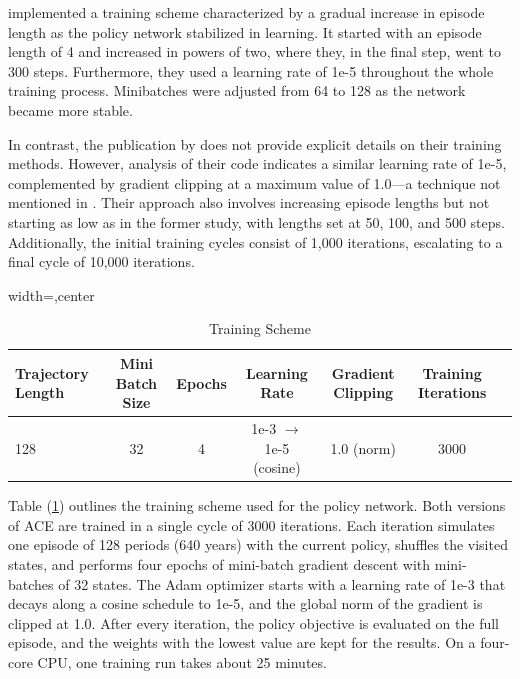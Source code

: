 \textcite{friedl2023_deepUQ} implemented a training scheme characterized by a gradual increase in episode length as the policy network stabilized in learning. It started with an episode length of 4 and increased in powers of two, where they, in the final step, went to 300 steps. Furthermore, they used a learning rate of 1e-5 throughout the whole training process. Minibatches were adjusted from 64 to 128 as the network became more stable.

In contrast, the publication by \textcite{Folini2024ClimateInCE} does not provide explicit details on their training methods. However, analysis of their code indicates a similar learning rate of 1e-5, complemented by gradient clipping at a maximum value of 1.0—a technique not mentioned in \textcite{friedl2023_deepUQ}. Their approach also involves increasing episode lengths but not starting as low as in the former study, with lengths set at 50, 100, and 500 steps. Additionally, the initial training cycles consist of 1,000 iterations, escalating to a final cycle of 10,000 iterations.

\begin{table}[ht]
\centering
\begin{adjustbox}{width=\textwidth,center}
{
\begin{tabular}{lcccccc}
    \toprule
    Trajectory Length & Mini Batch Size & Epochs & Learning Rate & Gradient Clipping & Training Iterations \\
    \midrule
    128 & 32 & 4 & 1e-3 \(\to\) 1e-5 (cosine) & 1.0 (norm) & 3000 \\
    \bottomrule
\end{tabular}
} \end{adjustbox}
\caption{Training Scheme}
\label{table:Training_Scheme_Results}
\end{table}

Table (\ref{table:Training_Scheme_Results}) outlines the training scheme used for the policy network. Both versions of ACE are trained in a single cycle of 3000 iterations. Each iteration simulates one episode of 128 periods (640 years) with the current policy, shuffles the visited states, and performs four epochs of mini-batch gradient descent with mini-batches of 32 states. The Adam optimizer \parencite{kingma2017adam} starts with a learning rate of 1e-3 that decays along a cosine schedule to 1e-5, and the global norm of the gradient is clipped at 1.0. After every iteration, the policy objective is evaluated on the full episode, and the weights with the lowest value are kept for the results. On a four-core CPU, one training run takes about 25 minutes.
